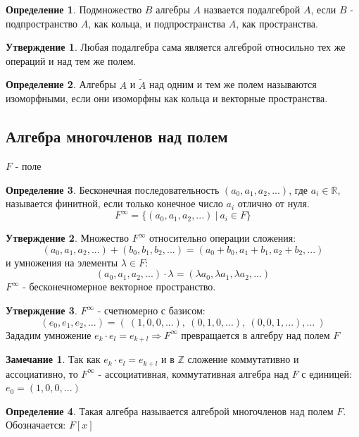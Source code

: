 \documentclass[a4paper, 12pt]{article}
\newcommand{\R}{\mathbb R}
\newcommand{\Z}{\mathbb Z}
\theoremstyle{definition}
\newtheorem*{definition}{Определение}
\newtheorem*{subtheorem}{Утверждение}
\newtheorem*{remark}{Замечание}
\begin{document}
  \begin{definition}
    Подмножество $B$ алгебры $A$ назвается подалгеброй $A$, если $B$ - подпространство $A$, как кольца, и подпространства $A$, как пространства.      
  \end{definition} 
  \begin{subtheorem}
    Любая подалгебра сама является алгеброй относильно тех же операций и над тем же полем.
  \end{subtheorem} 
  \begin{definition}
    Алгебры $A$ и $\widetilde{A}$ над одним и тем же полем называются изоморфными, если они изоморфны как кольца и векторные пространства.
  \end{definition}

  \subsection{Алгебра многочленов над полем}
  $F$ - поле
  \begin{definition}
    Бесконечная последовательность $(a_0,a_1, a_2,...)$, где $a_i \in \R$, называется финитной, если только конечное число $a_i$ отлично от нуля. 
    $$F^{\infty} = \{(a_0,a_1, a_2,...) \ |\ a_i \in F \}$$ 
  \end{definition}  
  \begin{subtheorem}
    Множество $F^{\infty}$ относительно операции сложения: $$(a_0,a_1, a_2,...) + (b_0,b_1, b_2,...) = (a_0+b_0,a_1+b_1, a_2+b_2,...)$$ и умножения на элементы $\lambda \in F$: $$(a_0,a_1, a_2,...) \cdot \lambda = (\lambda a_0,\lambda a_1, \lambda a_2,...)$$
    $F^{\infty}$ - бесконечномерное векторное пространство.   
  \end{subtheorem} 
  \begin{subtheorem}
    $F^{\infty}$ - счетномерно с базисом:
    $$(e_0,e_1,e_2,...) = ( \ (1, 0, 0, ...), \ (0, 1, 0, ...), \ (0, 0, 1, ...), ... \ )$$ 
    Зададим умножение $e_k \cdot e_l = e_{k+l} \Longrightarrow F^{\infty}$  превращается в алгебру над полем $F$ 
  \end{subtheorem} 
  \begin{remark}
    Так как $e_k \cdot e_l = e_{k+l}$ и в $\Z$ сложение коммутативно и ассоциативно, то $F^{\infty}$ - ассоциативная, коммутативная алгебра над $F$ с единицей: $e_0 = (1, 0, 0, ...)$
  \end{remark} 
  \begin{definition}
    Такая алгебра называется алгеброй многочленов над полем $F$. 
    Обозначается: $F[x]$  
  \end{definition} 
\end{document}
